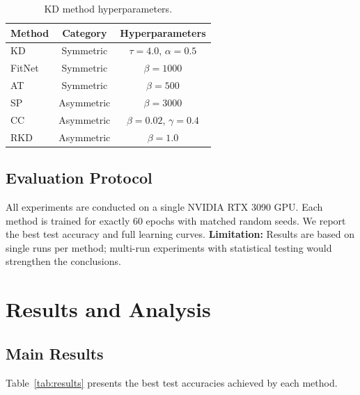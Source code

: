 \documentclass[symmetry,article,submit,moreauthors]{Definitions/mdpi}
\begin{document}
\begin{table}[H]
\caption{KD method hyperparameters.\label{tab:kdparams}}
\begin{tabularx}{\textwidth}{lCC}
\toprule
\textbf{Method} & \textbf{Category} & \textbf{Hyperparameters}\\
\midrule
KD~\cite{ref7} & Symmetric & $\tau=4.0$, $\alpha=0.5$\\
FitNet~\cite{ref8} & Symmetric & $\beta=1000$\\
AT~\cite{ref9} & Symmetric & $\beta=500$\\
SP~\cite{ref10} & Asymmetric & $\beta=3000$\\
CC~\cite{ref11} & Asymmetric & $\beta=0.02$, $\gamma=0.4$\\
RKD~\cite{ref12} & Asymmetric & $\beta=1.0$\\
\bottomrule
\end{tabularx}
\end{table}

\subsection{Evaluation Protocol}

All experiments are conducted on a single NVIDIA RTX 3090 GPU. Each method is trained for exactly 60 epochs with matched random seeds. We report the best test accuracy and full learning curves. \textbf{Limitation:} Results are based on single runs per method; multi-run experiments with statistical testing would strengthen the conclusions.

\section{Results and Analysis}

\subsection{Main Results}

Table~\ref{tab:results} presents the best test accuracies achieved by each method.
\end{document}
